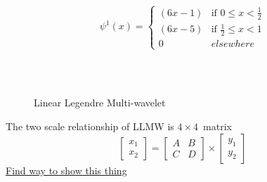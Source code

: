 \begin{equation}
\psi^1(x)=
\left\{
    \begin{array}{ll}
        (6x-1)  & \mbox{if } 0 \leq x < \frac{1}{2} \\
        (6x-5)  & \mbox{if } \frac{1}{2} \leq x < 1 \\
        0 & elsewhere
    \end{array}
\right.
\end{equation}

\begin{figure*}
\centering
{}\\
\\
\caption{Linear Legendre Multi-wavelet}
\label{fig:llmwphipsi}
\end{figure*}
The two scale relationship of LLMW is $4 \times 4$~matrix
\begin{equation}
\left[ \begin{array}{c} x_1 \\ x_2 \end{array} \right] = \begin{bmatrix} A & B \\ C & D \end{bmatrix} \times \left[ \begin{array}{c} y_1 \\ y_2 \end{array} \right]
\end{equation}
\underline{Find way to show this thing}


